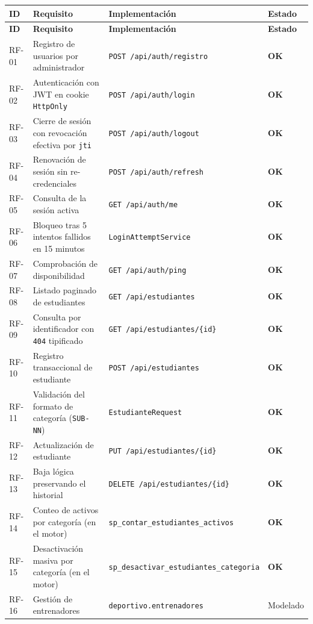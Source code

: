 \documentclass[11pt,a4paper]{article}
\newcommand{\ok}{\textcolor{okverde}{\textbf{OK}}}
\begin{document}
\renewcommand{\arraystretch}{1.15}
\begin{longtable}{@{}p{1.3cm}p{7.4cm}p{4.6cm}p{1.7cm}@{}}
\toprule
\textbf{ID} & \textbf{Requisito} & \textbf{Implementación} & \textbf{Estado} \\
\midrule
\endfirsthead
\toprule
\textbf{ID} & \textbf{Requisito} & \textbf{Implementación} & \textbf{Estado} \\
\midrule
\endhead

RF-01 & Registro de usuarios por administrador & \texttt{POST /api/auth/registro} & \ok \\
RF-02 & Autenticación con JWT en cookie \texttt{HttpOnly} & \texttt{POST /api/auth/login} & \ok \\
RF-03 & Cierre de sesión con revocación efectiva por \texttt{jti} & \texttt{POST /api/auth/logout} & \ok \\
RF-04 & Renovación de sesión sin re-credenciales & \texttt{POST /api/auth/refresh} & \ok \\
RF-05 & Consulta de la sesión activa & \texttt{GET /api/auth/me} & \ok \\
RF-06 & Bloqueo tras 5 intentos fallidos en 15 minutos & \texttt{LoginAttemptService} & \ok \\
RF-07 & Comprobación de disponibilidad & \texttt{GET /api/auth/ping} & \ok \\
RF-08 & Listado paginado de estudiantes & \texttt{GET /api/estudiantes} & \ok \\
RF-09 & Consulta por identificador con \texttt{404} tipificado & \texttt{GET /api/estudiantes/\{id\}} & \ok \\
RF-10 & Registro transaccional de estudiante & \texttt{POST /api/estudiantes} & \ok \\
RF-11 & Validación del formato de categoría (\texttt{SUB-NN}) & \texttt{EstudianteRequest} & \ok \\
RF-12 & Actualización de estudiante & \texttt{PUT /api/estudiantes/\{id\}} & \ok \\
RF-13 & Baja lógica preservando el historial & \texttt{DELETE /api/estudiantes/\{id\}} & \ok \\
RF-14 & Conteo de activos por categoría (en el motor) & \texttt{sp\_contar\_estudiantes\_activos} & \ok \\
RF-15 & Desactivación masiva por categoría (en el motor) & \texttt{sp\_desactivar\_estudiantes\_categoria} & \ok \\
\midrule
RF-16 & Gestión de entrenadores & \texttt{deportivo.entrenadores} & Modelado \\

\end{longtable}
\end{document}
